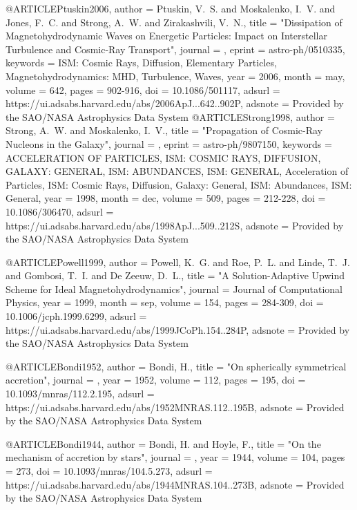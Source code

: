 \documentclass[useAMS,usenatbib]{mnras}
\begin{document}
{{{@ARTICLE{Ptuskin2006,
   author = {{Ptuskin}, V.~S. and {Moskalenko}, I.~V. and {Jones}, F.~C. and 
	{Strong}, A.~W. and {Zirakashvili}, V.~N.},
    title = "{Dissipation of Magnetohydrodynamic Waves on Energetic Particles: Impact on Interstellar Turbulence and Cosmic-Ray Transport}",
  journal = {\apj},
   eprint = {astro-ph/0510335},
 keywords = {ISM: Cosmic Rays, Diffusion, Elementary Particles, Magnetohydrodynamics: MHD, Turbulence, Waves},
     year = 2006,
    month = may,
   volume = 642,
    pages = {902-916},
      doi = {10.1086/501117},
   adsurl = {https://ui.adsabs.harvard.edu/abs/2006ApJ...642..902P},
  adsnote = {Provided by the SAO/NASA Astrophysics Data System}
}
@ARTICLE{Strong1998,
   author = {{Strong}, A.~W. and {Moskalenko}, I.~V.},
    title = "{Propagation of Cosmic-Ray Nucleons in the Galaxy}",
  journal = {\apj},
   eprint = {astro-ph/9807150},
 keywords = {ACCELERATION OF PARTICLES, ISM: COSMIC RAYS, DIFFUSION, GALAXY: GENERAL, ISM: ABUNDANCES, ISM: GENERAL, Acceleration of Particles, ISM: Cosmic Rays, Diffusion, Galaxy: General, ISM: Abundances, ISM: General},
     year = 1998,
    month = dec,
   volume = 509,
    pages = {212-228},
      doi = {10.1086/306470},
   adsurl = {https://ui.adsabs.harvard.edu/abs/1998ApJ...509..212S},
  adsnote = {Provided by the SAO/NASA Astrophysics Data System}
}

@ARTICLE{Powell1999,
   author = {{Powell}, K.~G. and {Roe}, P.~L. and {Linde}, T.~J. and {Gombosi}, T.~I. and 
	{De Zeeuw}, D.~L.},
    title = "{A Solution-Adaptive Upwind Scheme for Ideal Magnetohydrodynamics}",
  journal = {Journal of Computational Physics},
     year = 1999,
    month = sep,
   volume = 154,
    pages = {284-309},
      doi = {10.1006/jcph.1999.6299},
   adsurl = {https://ui.adsabs.harvard.edu/abs/1999JCoPh.154..284P},
  adsnote = {Provided by the SAO/NASA Astrophysics Data System}
}

@ARTICLE{Bondi1952,
   author = {{Bondi}, H.},
    title = "{On spherically symmetrical accretion}",
  journal = {\mnras},
     year = 1952,
   volume = 112,
    pages = {195},
      doi = {10.1093/mnras/112.2.195},
   adsurl = {https://ui.adsabs.harvard.edu/abs/1952MNRAS.112..195B},
  adsnote = {Provided by the SAO/NASA Astrophysics Data System}
}

@ARTICLE{Bondi1944,
   author = {{Bondi}, H. and {Hoyle}, F.},
    title = "{On the mechanism of accretion by stars}",
  journal = {\mnras},
     year = 1944,
   volume = 104,
    pages = {273},
      doi = {10.1093/mnras/104.5.273},
   adsurl = {https://ui.adsabs.harvard.edu/abs/1944MNRAS.104..273B},
  adsnote = {Provided by the SAO/NASA Astrophysics Data System}
}

}}}
\end{document}
